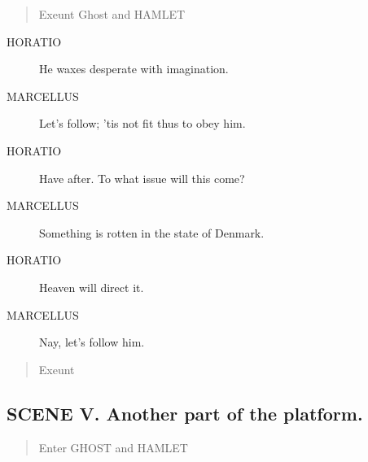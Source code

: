 \documentclass{article}
\begin{document}
\begin{quote}
Exeunt Ghost and HAMLET
\end{quote}
          
\begin{description}
            
\item[HORATIO] He waxes desperate with imagination.
\end{description}
          
\begin{description}
            
\item[MARCELLUS] Let's follow; 'tis not fit thus to obey him.
\end{description}
          
\begin{description}
            
\item[HORATIO] Have after. To what issue will this come?
\end{description}
          
\begin{description}
            
\item[MARCELLUS] Something is rotten in the state of Denmark.
\end{description}
          
\begin{description}
            
\item[HORATIO] Heaven will direct it.
\end{description}
          
\begin{description}
            
\item[MARCELLUS] Nay, let's follow him.
\end{description}
          
\begin{quote}
Exeunt
\end{quote}
          
\subsection{SCENE V.  Another part of the platform.}
          
\begin{quote}
Enter GHOST and HAMLET
\end{quote}
          
\end{document}
